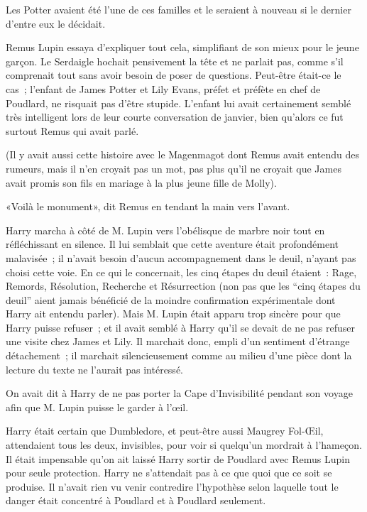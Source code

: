 Les Potter avaient été l'une de ces familles et le seraient à nouveau si le dernier d'entre eux le décidait.

Remus Lupin essaya d'expliquer tout cela, simplifiant de son mieux pour le jeune garçon. Le Serdaigle hochait pensivement la tête et ne parlait pas, comme s'il comprenait tout sans avoir besoin de poser de questions. Peut-être était-ce le cas~; l'enfant de James Potter et Lily Evans, préfet et préfète en chef de Poudlard, ne risquait pas d'être stupide. L'enfant lui avait certainement semblé très intelligent lors de leur courte conversation de janvier, bien qu'alors ce fut surtout Remus qui avait parlé.

(Il y avait aussi cette histoire avec le Magenmagot dont Remus avait entendu des rumeurs, mais il n'en croyait pas un mot, pas plus qu'il ne croyait que James avait promis son fils en mariage à la plus jeune fille de Molly).

«Voilà le monument», dit Remus en tendant la main vers l'avant.

\later

Harry marcha à côté de M. Lupin vers l'obélisque de marbre noir tout en réfléchissant en silence. Il lui semblait que cette aventure était profondément malavisée~; il n'avait besoin d'aucun accompagnement dans le deuil, n'ayant pas choisi cette voie. En ce qui le concernait, les cinq étapes du deuil étaient~: Rage, Remords, Résolution, Recherche et Résurrection (non pas que les “cinq étapes du deuil” aient jamais bénéficié de la moindre confirmation expérimentale dont Harry ait entendu parler). Mais M. Lupin était apparu trop sincère pour que Harry puisse refuser~; et il avait semblé à Harry qu'il se devait de ne pas refuser une visite chez James et Lily. Il marchait donc, empli d'un sentiment d'étrange détachement~; il marchait silencieusement comme au milieu d'une pièce dont la lecture du texte ne l'aurait pas intéressé.

On avait dit à Harry de ne pas porter la Cape d'Invisibilité pendant son voyage afin que M. Lupin puisse le garder à l'œil.

Harry était certain que Dumbledore, et peut-être aussi Maugrey Fol-Œil, attendaient tous les deux, invisibles, pour voir si quelqu'un mordrait à l'hameçon. Il était impensable qu'on ait laissé Harry sortir de Poudlard avec Remus Lupin pour seule protection. Harry ne s'attendait pas à ce que quoi que ce soit se produise. Il n'avait rien vu venir contredire l'hypothèse selon laquelle tout le danger était concentré à Poudlard et à Poudlard seulement.

